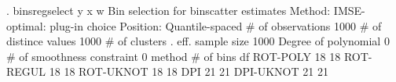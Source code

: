 . binsregselect y x w
{\smallskip}
Bin selection for binscatter estimates
Method: IMSE-optimal: plug-in choice
Position: Quantile-spaced
{\smallskip}
          \# of observations {\VBAR}    1000
       \# of distince values {\VBAR}    1000
              \# of clusters {\VBAR}       .
           eff. sample size {\VBAR}    1000
       Degree of polynomial {\VBAR}       0
 \# of smoothness constraint {\VBAR}       0
{\smallskip}
    method    {\VBAR}   \# of bins {\VBAR}     df   
   ROT-POLY   {\VBAR}      18     {\VBAR}     18
   ROT-REGUL  {\VBAR}      18     {\VBAR}     18
   ROT-UKNOT  {\VBAR}      18     {\VBAR}     18
      DPI     {\VBAR}      21     {\VBAR}     21
   DPI-UKNOT  {\VBAR}      21     {\VBAR}     21
